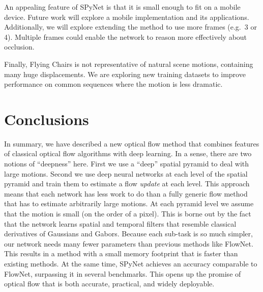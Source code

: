 \documentclass[10pt,twocolumn,letterpaper]{article}
\newcommand\myworries[1]{\textcolor{red}{#1}}
\begin{document}


An appealing feature of SPyNet is that it is small enough to fit on a mobile device.  
Future work will explore a mobile implementation and its applications.
Additionally, we will explore extending the method to use more frames (e.g.~3 or 4).  
Multiple frames could enable the network to reason more effectively about occlusion.

Finally, Flying Chairs is not representative of natural scene motions, containing many huge displacements.
We are exploring new training datasets to improve performance on common sequences where the motion is less dramatic.
\section{Conclusions}
In summary, we have described a new optical flow method that combines features of classical optical flow algorithms with deep learning.
In a sense, there are two notions of ``deepness'' here.
First we use a ``deep'' spatial pyramid to deal with large motions.
Second we use deep neural networks at each level of the spatial pyramid and train them to estimate a flow {\em update} at each level.
This approach means that each network has less work to do than a fully generic flow method that has to estimate arbitrarily large motions.
At each pyramid level we assume that the motion is small (on the order of a pixel).
This is borne out by the fact that the network learns spatial and temporal filters that resemble classical derivatives of Gaussians and Gabors.
Because each sub-task is so much simpler, our network needs many fewer parameters than previous methods like FlowNet.
This results in a method with a small memory footprint %
that is faster than existing methods.
At the same time, SPyNet achieves an accuracy comparable to FlowNet, surpassing it in several benchmarks. 
This opens up the promise of optical flow that is both accurate, practical, and widely deployable.
\end{document}

